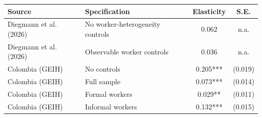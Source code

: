 \begin{tabular}{p{}p{}cc}
\toprule
    Source & Specification & Elasticity & S.E. \\
    \midrule
Diegmann et al. (2026) & No worker-heterogeneity controls & 0.062 & n.a. \\
Diegmann et al. (2026) & Observable worker controls & 0.036 & n.a. \\
\midrule
    Colombia (GEIH) & No controls & 0.205*** & (0.019) \\
Colombia (GEIH) & Full sample & 0.073*** & (0.014) \\
Colombia (GEIH) & Formal workers & 0.029** & (0.011) \\
Colombia (GEIH) & Informal workers & 0.132*** & (0.015)\\
\bottomrule\end{tabular}
